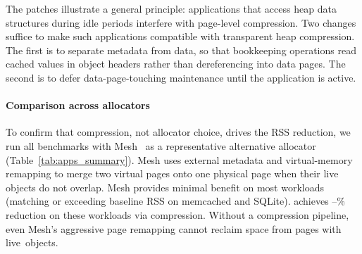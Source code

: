 The patches illustrate a general principle: applications that
access heap data structures during idle periods interfere with
page-level compression.  Two changes suffice to make such
applications compatible with transparent heap compression.
The first is to separate metadata from data, so that bookkeeping
operations read cached values in object headers rather than
dereferencing into data pages.  The second is to defer
data-page-touching maintenance until the application is active.

\paragraph{Comparison across allocators}
To confirm that compression, not allocator choice, drives the
RSS reduction, we run all benchmarks with
Mesh~\cite{powers2019mesh} as a representative alternative allocator
(Table~\ref{tab:apps_summary}).  Mesh uses external metadata and virtual-memory
remapping to merge two virtual pages onto one physical page when
their live objects do not overlap.
Mesh provides minimal benefit on most workloads
(matching or exceeding baseline RSS on memcached and SQLite).
\sys achieves \rssRedMin--\rssRedMax\%
reduction on these workloads via compression.
Without a compression pipeline, even Mesh's aggressive page
remapping cannot reclaim space from pages with live~objects.

